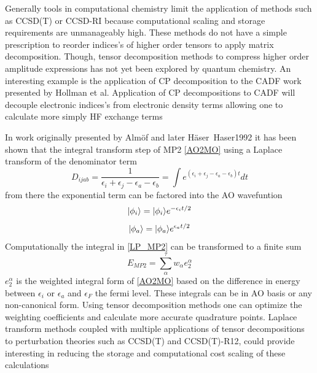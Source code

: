 	Generally tools in computational chemistry limit the application of methods such as CCSD(T) or CCSD-RI because computational scaling and storage  requirements are unmanageably high.  These methods do not have a simple prescription to reorder indices's of higher order tensors to apply matrix decomposition. Though, tensor decomposition methods to compress higher order amplitude expressions has not yet been explored by quantum chemistry. An interesting example is the application of CP decomposition to the CADF work presented by Hollman et al\cite{Hollman2014}.  Application of CP decompositions to CADF will decouple electronic indices's from electronic density terms allowing one to calculate more simply HF exchange terms %

	In work originally presented by Alm{\"o}f\cite{Almlof1991} and later H{\"a}ser\
	{Haser1992} it has been shown that the integral transform step of MP2 \cref{AO2MO} using a Laplace transform of the denominator term
		\begin{equation}\label{LP_MP2}
			D_{ijab} = \frac{1}{\epsilon_i + \epsilon_j - \epsilon_a - \epsilon_b} = \int e^{(\epsilon_i + \epsilon_j - \epsilon_a - \epsilon_b)t}dt
		\end{equation}
	from there the exponential term can be factored into the AO wavefuntion
		\begin{equation}
			| \phi_i \rangle = | \phi_i \rangle e^{-\epsilon_i t/2}
		\end{equation}
		\begin{equation}
			| \phi_a \rangle = | \phi_a \rangle e^{\epsilon_a t/2}
		\end{equation}
	Computationally the integral in \cref{LP_MP2} can be transformed to a finite sum
		\begin{equation}
			E_{MP2} = \sum_\alpha^\tau w_\alpha e_2^\alpha
		\end{equation}
	$e_2^\alpha$ is the weighted integral form of \cref{AO2MO} based on the difference in energy between $\epsilon_i$ or $\epsilon_a$ and $\epsilon_F$ the fermi level.  These integrals can be in AO basis or any non-canonical form.  Using tensor decomposition methods one can optimize the weighting coefficients and calculate more accurate quadrature points.  Laplace transform methods coupled with multiple applications of tensor decompositions to perturbation theories such as CCSD(T) and CCSD(T)-R12, could provide interesting in reducing the storage and computational cost scaling of these calculations